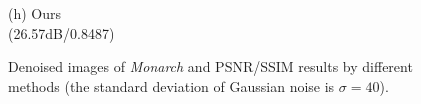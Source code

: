\documentclass[runningheads]{llncs}
\begin{document}
\begin{figure}
{\begin{minipage}[t]{0.244\textwidth}
{\footnotesize (h) Ours \\(26.57dB/0.8487)}
\end{minipage}
}
\caption{Denoised images of \textsl{Monarch} and PSNR/SSIM results by different methods (the standard deviation of Gaussian noise is $\sigma=40$).}
\label{fig4}
\end{figure}

\begin{figure}
\centering
{}
\end{figure}
\end{document}
